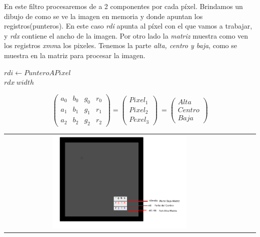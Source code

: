 \begin{multicols}{2}
En este filtro procesaremos de a 2 componentes por cada píxel. Brindamos un dibujo de como se ve la imagen en memoria y donde apuntan los registros(punteros). En este caso \emph{rdi} apunta al píxel con el que vamos a trabajar, y \emph{rdx} contiene el ancho de la imagen. Por otro lado la \emph{matriz} muestra como ven los registros \emph{xmm}a los pixeles. Tenemos la parte  \emph{alta, centro y baja}, como se muestra en la matriz para procesar la imagen.
\begin{center}
		$rdi \gets PunteroAPixel$ \\
		$rdx \ width$
\end{center}

\begin{center}
\[ \left( \begin{array}{cccc}
 a_0 & b_0 & g_0 & r_0 \\ 
 a_1 & b_1 & g_1 & r_1 \\
 a_2 & b_2 & g_2 & r_2
\end{array} \right) = \left( \begin{array}{cccc}
 Pixel_1 \\ 
 Pixel_2 \\
 Pexel_3
\end{array} \right)\ = \left( \begin{array}{cccc}
 Alta \\ 
 Centro \\
 Baja
\end{array} \right)\] 

\end{center}

    \begin{center}
	    \begin{tabular}{cccc}
		  \includegraphics[width=0.6\textwidth]{imagenes/edge/edge1.png} \\
		\end{tabular}
	\end{center}

\end{multicols}

